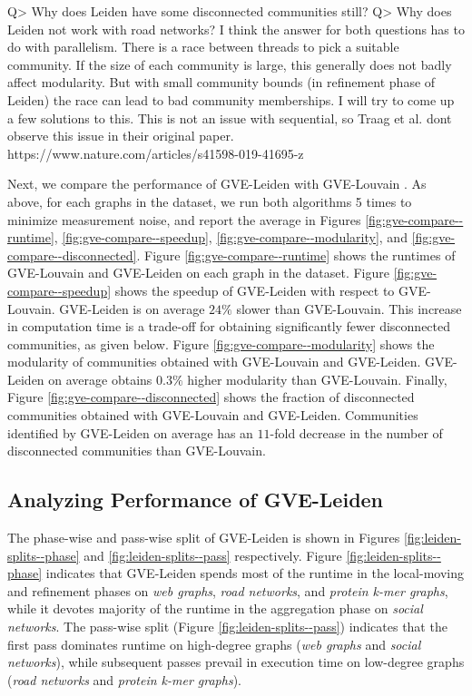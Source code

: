 Q> Why does Leiden have some disconnected communities still?
Q> Why does Leiden not work with road networks?
I think the answer for both questions has to do with parallelism. There is a race between threads to pick a suitable community. If the size of each community is large, this generally does not badly affect modularity. But with small community bounds (in refinement phase of Leiden) the race can lead to bad community memberships. I will try to come up a few solutions to this. This is not an issue with sequential, so Traag et al. dont observe this issue in their original paper.
https://www.nature.com/articles/s41598-019-41695-z




Next, we compare the performance of GVE-Leiden with GVE-Louvain \cite{sahu2023gvelouvain}. As above, for each graphs in the dataset, we run both algorithms 5 times to minimize measurement noise, and report the average in Figures \ref{fig:gve-compare--runtime}, \ref{fig:gve-compare--speedup}, \ref{fig:gve-compare--modularity}, and \ref{fig:gve-compare--disconnected}. Figure \ref{fig:gve-compare--runtime} shows the runtimes of GVE-Louvain and GVE-Leiden on each graph in the dataset. Figure \ref{fig:gve-compare--speedup} shows the speedup of GVE-Leiden with respect to GVE-Louvain. GVE-Leiden is on average $24\%$ slower than GVE-Louvain. This increase in computation time is a trade-off for obtaining significantly fewer disconnected communities, as given below. Figure \ref{fig:gve-compare--modularity} shows the modularity of communities obtained with GVE-Louvain and GVE-Leiden. GVE-Leiden on average obtains $0.3\%$ higher modularity than GVE-Louvain. Finally, Figure \ref{fig:gve-compare--disconnected} shows the fraction of disconnected communities obtained with GVE-Louvain and GVE-Leiden. Communities identified by GVE-Leiden on average has an $11$-fold decrease in the number of disconnected communities than GVE-Louvain.








\subsection{Analyzing Performance of GVE-Leiden}

The phase-wise and pass-wise split of GVE-Leiden is shown in Figures \ref{fig:leiden-splits--phase} and \ref{fig:leiden-splits--pass} respectively. Figure \ref{fig:leiden-splits--phase} indicates that GVE-Leiden spends most of the runtime in the local-moving and refinement phases on \textit{web graphs}, \textit{road networks}, and \textit{protein k-mer graphs}, while it devotes majority of the runtime in the aggregation phase on \textit{social networks}. The pass-wise split (Figure \ref{fig:leiden-splits--pass}) indicates that the first pass dominates runtime on high-degree graphs (\textit{web graphs} and \textit{social networks}), while subsequent passes prevail in execution time on low-degree graphs (\textit{road networks} and \textit{protein k-mer graphs}).

